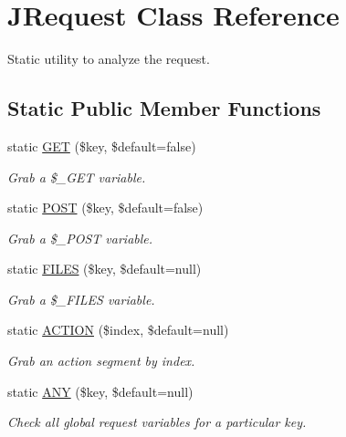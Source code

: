 \hypertarget{classJRequest}{\section{J\-Request Class Reference}
\label{classJRequest}
}


Static utility to analyze the request.  


\subsection*{Static Public Member Functions}
\begin{DoxyCompactItemize}
\item 
static \hyperlink{classJRequest_a115ed07fcb947770a6da19842b22c7a3}{G\-E\-T} (\$key, \$default=false)
\begin{DoxyCompactList}\small\item\em Grab a \$\-\_\-\-G\-E\-T variable. \end{DoxyCompactList}\item 
static \hyperlink{classJRequest_aa91e41f6bb2439b135af0c0ca9efe672}{P\-O\-S\-T} (\$key, \$default=false)
\begin{DoxyCompactList}\small\item\em Grab a \$\-\_\-\-P\-O\-S\-T variable. \end{DoxyCompactList}\item 
static \hyperlink{classJRequest_a4aa1f0dde5868f9782bf5a0269fcf699}{F\-I\-L\-E\-S} (\$key, \$default=null)
\begin{DoxyCompactList}\small\item\em Grab a \$\-\_\-\-F\-I\-L\-E\-S variable. \end{DoxyCompactList}\item 
static \hyperlink{classJRequest_a89a13c8cfb85ed2f879244cbf10db860}{A\-C\-T\-I\-O\-N} (\$index, \$default=null)
\begin{DoxyCompactList}\small\item\em Grab an action segment by index. \end{DoxyCompactList}\item 
static \hyperlink{classJRequest_a65785ba3995d7f0c9ad85d277b36f88d}{A\-N\-Y} (\$key, \$default=null)
\begin{DoxyCompactList}\small\item\em Check all global request variables for a particular key. \end{DoxyCompactList}\end{DoxyCompactItemize}


